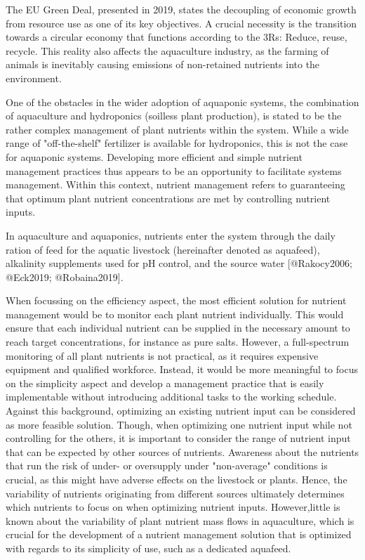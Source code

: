 The EU Green Deal, presented in 2019, states the decoupling of economic growth from resource use as one of its key objectives. A crucial necessity is the transition towards a circular economy that functions according to the 3Rs: Reduce, reuse, recycle. This reality also affects the aquaculture industry, as the farming of animals is inevitably causing emissions of non-retained nutrients into the environment. 


One of the obstacles in the wider adoption of aquaponic systems, the combination of aquaculture and hydroponics (soilless plant production), is stated to be the rather complex management of plant nutrients within the system. While a wide range of "off-the-shelf" fertilizer is available for hydroponics, this is not the case for aquaponic systems. Developing more efficient and simple nutrient management practices thus appears to be an opportunity to facilitate systems management. Within this context, nutrient management refers to guaranteeing that optimum plant nutrient concentrations are met by controlling nutrient inputs.



In aquaculture and aquaponics, nutrients enter the system through the daily ration of feed for the aquatic livestock (hereinafter denoted as aquafeed), alkalinity supplements used for pH control, and the source water [@Rakocy2006; @Eck2019; @Robaina2019]. 



When focussing on the efficiency aspect, the most efficient solution for nutrient management would be to monitor each plant nutrient individually. This would ensure that each individual nutrient can be supplied in the necessary amount to reach target concentrations, for instance as pure salts. However, a full-spectrum monitoring of all plant nutrients is not practical, as it requires expensive equipment and qualified workforce. Instead, it would be more meaningful to focus on the simplicity aspect and develop a management practice that is easily implementable without introducing additional tasks to the working schedule. Against this background, optimizing an existing nutrient input can be considered as more feasible solution. Though, when optimizing one nutrient input while not controlling for the others, it is important to consider the range of nutrient input that can be expected by other sources of nutrients. Awareness about the nutrients that run the risk of under- or oversupply under "non-average" conditions is crucial, as this might have adverse effects on the livestock or plants. Hence, the variability of nutrients originating from different sources ultimately determines which nutrients to focus on when optimizing nutrient inputs. However,little is known about the variability of plant nutrient mass flows in aquaculture, which is crucial for the development of a nutrient management solution that is optimized with regards to its simplicity of use, such as a dedicated aquafeed. 